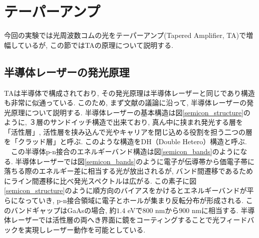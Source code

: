 \documentclass[uplatex, dvipdfmx, a4paper, report, papersize, 11pt]{jsbook}
\begin{document}
\section{テーパーアンプ}
今回の実験では光周波数コムの光をテーパーアンプ(Tapered Amplifier,  TA)で増幅しているが, この節ではTAの原理について説明する.

\subsection{半導体レーザーの発光原理}
TAは半導体で構成されており, その発光原理は半導体レーザーと同じであり構造も非常に似通っている. このため, まず文献\cite{わかる半導体レーザーの基礎と応用}の議論に沿って, 半導体レーザーの発光原理について説明する. 半導体レーザーの基本構造は図\ref{semicon_structure}のように, ３層のサンドイッチ構造で出来ており, 真ん中に挟まれ発光する層を「活性層」, 活性層を挟み込んで光やキャリアを閉じ込める役割を担う二つの層を「クラッド層」と呼ぶ. このような構造をDH（Double Hetero）構造と呼ぶ.\\
　この半導体p-n接合のエネルギーバンド構造は図\ref{semicon_bands}のようになる. 半導体レーザーでは図\ref{semicon_bands}のように電子が伝導帯から価電子帯に落ちる際のエネルギー差に相当する光が放出されるが, バンド間遷移であるためにライン間遷移に比べ発光スペクトルは広がる. この素子に図\ref{semicon_structure}のように順方向のバイアスをかけるとエネルギーバンドが平らになっていき, p-n接合領域に電子とホールが集まり反転分布が形成される. このバンドギャップはGaAsの場合, 約$1.4$ eVで$800$ nmから$900$ nmに相当する\cite{grynberg_aspect_fabre_cohen-tannoudji_2010}. 半導体レーザーでは活性層の両へき界面に鏡をコーティングすることで光フィードバックを実現しレーザー動作を可能としている.
\end{document}
